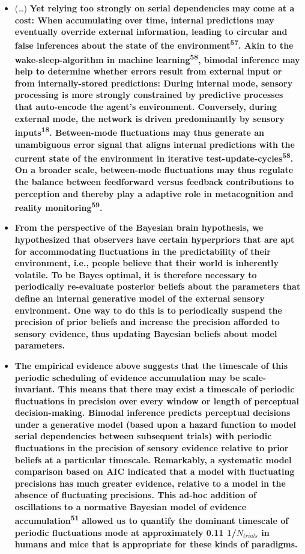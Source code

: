 \documentclass[
]{article}
\begin{document}
\begin{itemize}
\item
  (\ldots) \textbf{Yet relying too strongly on serial dependencies may
  come at a cost: When accumulating over time, internal predictions may
  eventually override external information, leading to circular and
  false inferences about the state of the
  environment\textsuperscript{57}. Akin to the wake-sleep-algorithm in
  machine learning\textsuperscript{58}, bimodal inference may help to
  determine whether errors result from external input or from
  internally-stored predictions: During internal mode, sensory
  processing is more strongly constrained by predictive processes that
  auto-encode the agent's environment. Conversely, during external mode,
  the network is driven predominantly by sensory
  inputs\textsuperscript{18}. Between-mode fluctuations may thus
  generate an unambiguous error signal that aligns internal predictions
  with the current state of the environment in iterative
  test-update-cycles\textsuperscript{58}. On a broader scale,
  between-mode fluctuations may thus regulate the balance between
  feedforward versus feedback contributions to perception and thereby
  play a adaptive role in metacognition and reality
  monitoring\textsuperscript{59}.}
\item
  \textbf{From the perspective of the Bayesian brain hypothesis, we
  hypothesized that observers have certain hyperpriors that are apt for
  accommodating fluctuations in the predictability of their environment,
  i.e., people believe that their world is inherently volatile. To be
  Bayes optimal, it is therefore necessary to periodically re-evaluate
  posterior beliefs about the parameters that define an internal
  generative model of the external sensory environment. One way to do
  this is to periodically suspend the precision of prior beliefs and
  increase the precision afforded to sensory evidence, thus updating
  Bayesian beliefs about model parameters.}
\item
  \textbf{The empirical evidence above suggests that the timescale of
  this periodic scheduling of evidence accumulation may be
  scale-invariant. This means that there may exist a timescale of
  periodic fluctuations in precision over every window or length of
  perceptual decision-making. Bimodal inference predicts perceptual
  decisions under a generative model (based upon a hazard function to
  model serial dependencies between subsequent trials) with periodic
  fluctuations in the precision of sensory evidence relative to prior
  beliefs at a particular timescale. Remarkably, a systematic model
  comparison based on AIC indicated that a model with fluctuating
  precisions has much greater evidence, relative to a model in the
  absence of fluctuating precisions. This ad-hoc addition of
  oscillations to a normative Bayesian model of evidence
  accumulation\textsuperscript{51} allowed us to quantify the dominant
  timescale of periodic fluctuations mode at approximately 0.11
  1/\(N_{trials}\) in humans and mice that is appropriate for these
  kinds of paradigms.}
\end{itemize}
\end{document}
